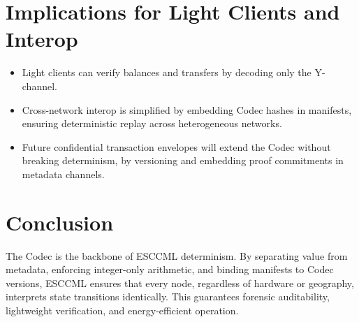 \documentclass[11pt, a4paper]{article}
\begin{document}
\section{Implications for Light Clients and Interop}
\begin{itemize}
    \item Light clients can verify balances and transfers by decoding only the Y-channel.
    \item Cross-network interop is simplified by embedding Codec hashes in manifests,
    ensuring deterministic replay across heterogeneous networks.
    \item Future confidential transaction envelopes will extend the Codec without breaking
    determinism, by versioning and embedding proof commitments in metadata channels.
\end{itemize}

\section{Conclusion}
The Codec is the backbone of ESCCML determinism. By separating value from metadata,
enforcing integer-only arithmetic, and binding manifests to Codec versions, ESCCML ensures
that every node, regardless of hardware or geography, interprets state transitions identically.
This guarantees forensic auditability, lightweight verification, and energy-efficient operation.
\end{document}
